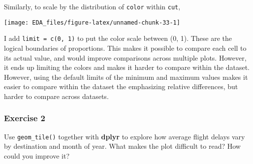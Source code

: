 \documentclass[]{book}
\newenvironment{Shaded}{\begin{snugshade}}{\end{snugshade}}
\newcommand{\DataTypeTok}[1]{\textcolor[rgb]{0.13,0.29,0.53}{#1}}
\newcommand{\DecValTok}[1]{\textcolor[rgb]{0.00,0.00,0.81}{#1}}
\newcommand{\KeywordTok}[1]{\textcolor[rgb]{0.13,0.29,0.53}{\textbf{#1}}}
\newcommand{\NormalTok}[1]{#1}
\newcommand{\OperatorTok}[1]{\textcolor[rgb]{0.81,0.36,0.00}{\textbf{#1}}}
\newcommand{\StringTok}[1]{\textcolor[rgb]{0.31,0.60,0.02}{#1}}
\theoremstyle{plain}
\theoremstyle{remark}
\theoremstyle{definition}
\theoremstyle{definition}
\theoremstyle{definition}
\theoremstyle{remark}
\begin{document}
Similarly, to scale by the distribution of \texttt{color} within
\texttt{cut},

\begin{Shaded}
\end{Shaded}

\begin{center}\texttt{[image: EDA\_files/figure-latex/unnamed-chunk-33-1]} \end{center}

I add \texttt{limit\ =\ c(0,\ 1)} to put the color scale between (0, 1).
These are the logical boundaries of proportions. This makes it possible
to compare each cell to its actual value, and would improve comparisons
across multiple plots. However, it ends up limiting the colors and makes
it harder to compare within the dataset. However, using the default
limits of the minimum and maximum values makes it easier to compare
within the dataset the emphasizing relative differences, but harder to
compare across datasets.

\hypertarget{exercise-2-15}{%
\subsubsection{Exercise 2}\label{exercise-2-15}}

Use \texttt{geom\_tile()} together with \textbf{dplyr} to explore how
average flight delays vary by destination and month of year. What makes
the plot difficult to read? How could you improve it?
\end{document}
